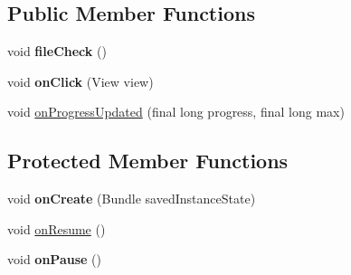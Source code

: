\subsection*{Public Member Functions}
\begin{DoxyCompactItemize}
\item 
void {\bfseries file\+Check} ()\hypertarget{classcom_1_1example_1_1android_1_1wearable_1_1wcldemo_1_1pages_1_1FileTransferActivity_ab5d34a68bab9687e8c6c6728078b1787}{}\label{classcom_1_1example_1_1android_1_1wearable_1_1wcldemo_1_1pages_1_1FileTransferActivity_ab5d34a68bab9687e8c6c6728078b1787}

\item 
void {\bfseries on\+Click} (View view)\hypertarget{classcom_1_1example_1_1android_1_1wearable_1_1wcldemo_1_1pages_1_1FileTransferActivity_a9e8bcc2ee814cbb77934257f8094861b}{}\label{classcom_1_1example_1_1android_1_1wearable_1_1wcldemo_1_1pages_1_1FileTransferActivity_a9e8bcc2ee814cbb77934257f8094861b}

\item 
void \hyperlink{classcom_1_1example_1_1android_1_1wearable_1_1wcldemo_1_1pages_1_1FileTransferActivity_a1d913d854d84ec830dc2bc724d580bef}{on\+Progress\+Updated} (final long progress, final long max)
\end{DoxyCompactItemize}
\subsection*{Protected Member Functions}
\begin{DoxyCompactItemize}
\item 
void {\bfseries on\+Create} (Bundle saved\+Instance\+State)\hypertarget{classcom_1_1example_1_1android_1_1wearable_1_1wcldemo_1_1pages_1_1FileTransferActivity_a850d1ecdeb1eeab869a6775c2b06f8ad}{}\label{classcom_1_1example_1_1android_1_1wearable_1_1wcldemo_1_1pages_1_1FileTransferActivity_a850d1ecdeb1eeab869a6775c2b06f8ad}

\item 
void \hyperlink{classcom_1_1example_1_1android_1_1wearable_1_1wcldemo_1_1pages_1_1FileTransferActivity_a722d42846eabd9a70e5cc9d0b534247d}{on\+Resume} ()
\item 
void {\bfseries on\+Pause} ()\hypertarget{classcom_1_1example_1_1android_1_1wearable_1_1wcldemo_1_1pages_1_1FileTransferActivity_a1a7be84800a05c0f9c69f842c50dafc7}{}\label{classcom_1_1example_1_1android_1_1wearable_1_1wcldemo_1_1pages_1_1FileTransferActivity_a1a7be84800a05c0f9c69f842c50dafc7}

\end{DoxyCompactItemize}


